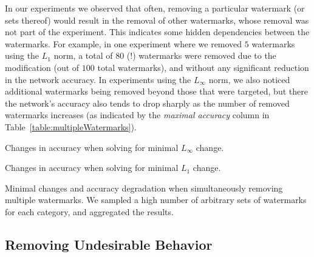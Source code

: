 \documentclass{easychair}
\begin{document}
In our experiments we observed that often, removing a particular
watermark (or sets thereof) would result in the removal of other
watermarks, whose removal was not part of the experiment. This
indicates some hidden dependencies between the watermarks.  For
example, in one experiment where we removed $5$ watermarks using the
$L_1$ norm, a total of $80$ (!) watermarks were removed
due to the modification (out of $100$ total watermarks),
and without any significant reduction in the network accuracy. In
experiments using the
$L_\infty$ norm, we also noticed additional watermarks being removed
beyond those that were targeted, but there the network's accuracy also
tends to drop sharply as the number of removed watermarks increases (as indicated by the
\emph{maximal accuracy} column in Table~\ref{table:multipleWatermarks}).


\begin{table}
\begin{subtable}{1\textwidth}
\centering
{}
\caption{Changes in accuracy when solving for minimal $L_\infty$ change.}
\end{subtable}
\begin{subtable}{1\textwidth}
\centering
{}
\caption{Changes in accuracy when solving for minimal $L_1$ change.}
\end{subtable}
\caption{Minimal changes and accuracy degradation when simultaneously
  removing multiple watermarks. We sampled a high number of arbitrary
  sets of watermarks for each category, and aggregated the results.}
\label{table:multipleWatermarks}
\end{table}


\subsection{Removing Undesirable Behavior}
\end{document}
